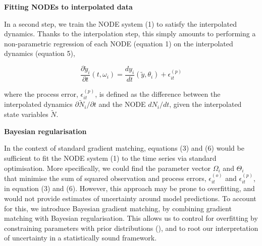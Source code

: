 \documentclass[11pt, oneside]{article}
\begin{document}
% 


\textbf{Fitting NODEs to interpolated data}

In a second step, we train the NODE system (1) to satisfy the interpolated dynamics.
Thanks to the interpolation step, this simply amounts to performing a non-parametric regression of each NODE (equation 1) on the interpolated dynamics (equation 5),

 
\vspace{-0.5cm}
\begin{equation}
    \frac{\partial \tilde{y}_i}{\partial t} (t, \omega_i) = \frac{dy_i}{dt} \left( \tilde{y},\theta_i \right) + \epsilon^{(p)}_{it}
\end{equation}


where the process error, $\epsilon^{(p)}_{it}$, is defined as the difference between the interpolated dynamics $\partial \tilde{N}_i/\partial t$ and the NODE $dN_i/dt$, given the interpolated state variables $\tilde{N}$. 

\textbf{Bayesian regularisation}

In the context of standard gradient matching, equations (3) and (6) would be sufficient to fit the NODE system (1) to the time series via standard optimisation.
More specifically, we could find the parameter vector $\Omega_i$ and $\Theta_i$ that minimise the sum of squared observation and process errors, $\epsilon_{it}^{(o)}$ and $\epsilon_{it}^{(p)}$, in equation (3) and (6).
However, this approach may be prone to overfitting, and would not provide estimates of uncertainty around model predictions. 
To account for this, we introduce Bayesian gradient matching, by combining gradient matching with Bayesian regularisation. 
This allows us to control for overfitting by constraining parameters with prior distributions (\cite{Cawley2007}), and to root our interpretation of uncertainty in a statistically sound framework.
\end{document}

